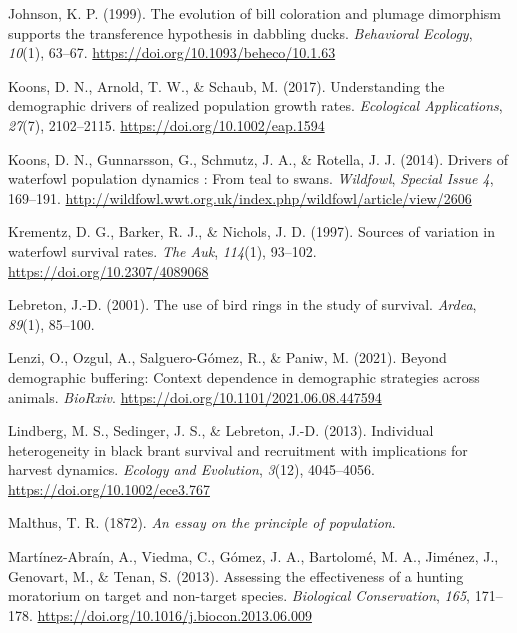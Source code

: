 \documentclass[
  english,
]{article}
\newlength{\cslhangindent}
\newlength{\cslentryspacingunit} %
\newenvironment{CSLReferences}[2] %
 {%
  \setlength{\parindent}{0pt}
  \ifodd #1
  \let\oldpar\par
  \def\par{\hangindent=\cslhangindent\oldpar}
  \fi
  \setlength{\parskip}{#2\cslentryspacingunit}
 }%
 {}
\begin{document}
\begin{CSLReferences}{1}{0}
\leavevmode{}%
Johnson, K. P. (1999). The evolution of bill coloration and plumage dimorphism supports the transference hypothesis in dabbling ducks. \emph{Behavioral Ecology}, \emph{10}(1), 63--67. \url{https://doi.org/10.1093/beheco/10.1.63}

\leavevmode{}%
Koons, D. N., Arnold, T. W., \& Schaub, M. (2017). Understanding the demographic drivers of realized population growth rates. \emph{Ecological Applications}, \emph{27}(7), 2102--2115. \url{https://doi.org/10.1002/eap.1594}

\leavevmode{}%
Koons, D. N., Gunnarsson, G., Schmutz, J. A., \& Rotella, J. J. (2014). Drivers of waterfowl population dynamics : From teal to swans. \emph{Wildfowl}, \emph{Special Issue 4}, 169--191. \url{http://wildfowl.wwt.org.uk/index.php/wildfowl/article/view/2606}

\leavevmode{}%
Krementz, D. G., Barker, R. J., \& Nichols, J. D. (1997). Sources of variation in waterfowl survival rates. \emph{The Auk}, \emph{114}(1), 93--102. \url{https://doi.org/10.2307/4089068}

\leavevmode{}%
Lebreton, J.-D. (2001). The use of bird rings in the study of survival. \emph{Ardea}, \emph{89}(1), 85--100.

\leavevmode{}%
Lenzi, O., Ozgul, A., Salguero-Gómez, R., \& Paniw, M. (2021). Beyond demographic buffering: Context dependence in demographic strategies across animals. \emph{BioRxiv}. \url{https://doi.org/10.1101/2021.06.08.447594}

\leavevmode{}%
Lindberg, M. S., Sedinger, J. S., \& Lebreton, J.-D. (2013). Individual heterogeneity in black brant survival and recruitment with implications for harvest dynamics. \emph{Ecology and Evolution}, \emph{3}(12), 4045--4056. \url{https://doi.org/10.1002/ece3.767}

\leavevmode{}%
Malthus, T. R. (1872). \emph{An essay on the principle of population}.

\leavevmode{}%
Martínez-Abraín, A., Viedma, C., Gómez, J. A., Bartolomé, M. A., Jiménez, J., Genovart, M., \& Tenan, S. (2013). Assessing the effectiveness of a hunting moratorium on target and non-target species. \emph{Biological Conservation}, \emph{165}, 171--178. \url{https://doi.org/10.1016/j.biocon.2013.06.009}


\end{CSLReferences}
\end{document}
